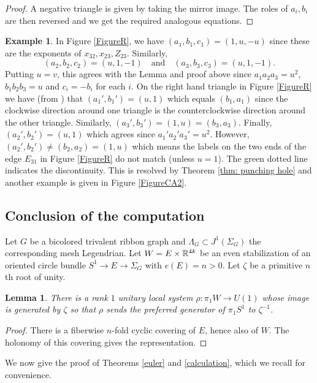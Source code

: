 \documentclass[11pt]{article}
\numberwithin{equation}{section}\providecommand{\dpl}{\displaystyle}
\theoremstyle{plain}
\newtheorem{lemma}[theorem]{Lemma}
\theoremstyle{definition}
\newtheorem{example}[theorem]{Example}
\begin{document}
\begin{proof}
A negative triangle is given by taking the mirror image. The roles of $a_i,b_i$ are then reversed and we get the required analogous equations.
\end{proof}
\begin{example}
In Figure \ref{FigureR}, we have $(a_1,b_1,c_1)=(1,u,-u)$ since these are the expo\-nents of $x_{32},x_{23}, Z_{23}$. Similarly,
\[
(a_2,b_2,c_2)=(u,1,-1)\quad\text{and}\quad(a_3,b_3,c_3)=(u,1,-1).
\]
Putting $u=v$, this agrees with the Lemma and proof above since $a_1a_2a_3=u^2$, $b_1b_2b_3=u$ and $c_i=-b_i$ for each $i$. On the right hand triangle in Figure \ref{FigureR} we have (from \cite{IK93}) that $(a_1',b_1')=(u,1)$ which equals $(b_1,a_1)$ since the clockwise direction around one triangle is the counterclockwise direction around the other triangle. Similarly, $(a_3',b_3')=(1,u)=(b_3,a_3)$. Finally, $(a_2',b_2')=(u,1)$ which agrees since $a_1'a_2'a_3'=u^2$. However, $(a_2',b_2')\neq (b_2,a_2)=(1,u)$ which means the labels on the two ends of the edge $E_{31}$ in Figure \ref{FigureR} do not match (unless $u=1$). The green dotted line indicates the discontinuity. This is resolved by Theorem \ref{thm: punching hole} and another example is given in Figure \ref{FigureCA2}.
\end{example}

\subsection{Conclusion of the computation} Let $G$ be a bicolored trivalent ribbon graph and $\Lambda_G\subset J^1(\Sigma_G)$ the corresponding mesh Legendrian. Let $W=E \times \mathbb{R}^{4k}$ be an even stabilization of an oriented circle bundle $S^1 \to E \to \Sigma_G$ with $e(E)=n>0$. Let $\zeta$ be a primitive $n$th root of unity.

\begin{lemma}
There is a rank $1$ unitary local system $\rho:\pi_1W\to U(1)$ whose image is generated by $\zeta$ so that $\rho$ sends the preferred generator of $\pi_1S^1$ to $\zeta^{-1}$.
\end{lemma}

\begin{proof}
There is a fiberwise $n$-fold cyclic covering of $E$, hence also of $W$. The holonomy of this covering gives the representation.
\end{proof}

We now give the proof of Theorems \ref{euler} and \ref{calculation}, which we recall for convenience.
\end{document}
